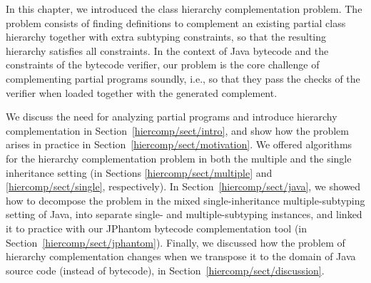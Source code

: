 In this chapter, we introduced the class hierarchy complementation
problem. The problem consists of finding definitions to complement an
existing partial class hierarchy together with extra subtyping
constraints, so that the resulting hierarchy satisfies all
constraints. In the context of Java bytecode and the constraints of
the bytecode verifier, our problem is the core challenge of
complementing partial programs soundly, i.e., so that they pass the
checks of the verifier when loaded together with the generated
complement.

We discuss the need for analyzing partial programs and introduce
hierarchy complementation in Section~\ref{hiercomp/sect/intro}, and show how
the problem arises in practice in Section~\ref{hiercomp/sect/motivation}.
%
We offered algorithms for the hierarchy complementation problem in
both the multiple and the single inheritance setting (in Sections
\ref{hiercomp/sect/multiple} and \ref{hiercomp/sect/single}, respectively).
%
In Section~\ref{hiercomp/sect/java}, we showed how to decompose the problem
in the mixed single-inheritance multiple-subtyping setting of Java,
into separate single- and multiple-subtyping instances, and linked it
to practice with our JPhantom bytecode complementation tool (in
Section~\ref{hiercomp/sect/jphantom}).
%
Finally, we discussed how the problem of hierarchy complementation
changes when we transpose it to the domain of Java source code
(instead of bytecode), in Section~\ref{hiercomp/sect/discussion}.


